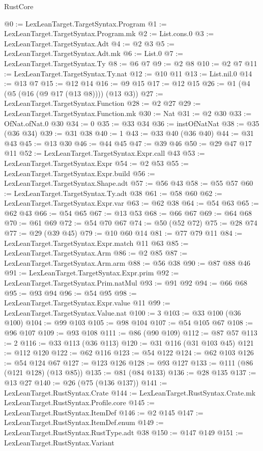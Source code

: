 \begin{lexlean}{RustCore}
\begin{coremodule}
@0 := LexLeanTarget.TargetSyntax.Program
@1 := LexLeanTarget.TargetSyntax.Program.mk
@2 := List.cons.{0}
@3 := LexLeanTarget.TargetSyntax.Adt
@4 := @2 @3
@5 := LexLeanTarget.TargetSyntax.Adt.mk
@6 := List.{0}
@7 := LexLeanTarget.TargetSyntax.Ty
@8 := @6 @7
@9 := @2 @8
@10 := @2 @7
@11 := LexLeanTarget.TargetSyntax.Ty.nat
@12 := @10 @11
@13 := List.nil.{0}
@14 := @13 @7
@15 := @12 @14
@16 := @9 @15
@17 := @12 @15
@26 := @1 (@4 (@5 (@16 (@9 @17 (@13 @8)))) (@13 @3))
@27 := LexLeanTarget.TargetSyntax.Function
@28 := @2 @27
@29 := LexLeanTarget.TargetSyntax.Function.mk
@30 := Nat
@31 := @2 @30
@33 := OfNat.ofNat.{0} @30
@34 := 0
@35 := @33 @34
@36 := instOfNatNat
@38 := @35 (@36 @34)
@39 := @31 @38
@40 := 1
@43 := @33 @40 (@36 @40)
@44 := @31 @43
@45 := @13 @30
@46 := @44 @45
@47 := @39 @46
@50 := @29 @47 @17 @11
@52 := LexLeanTarget.TargetSyntax.Expr.call @43
@53 := LexLeanTarget.TargetSyntax.Expr
@54 := @2 @53
@55 := LexLeanTarget.TargetSyntax.Expr.build
@56 := LexLeanTarget.TargetSyntax.Shape.adt
@57 := @56 @43
@58 := @55 @57
@60 := LexLeanTarget.TargetSyntax.Ty.adt @38
@61 := @58 @60
@62 := LexLeanTarget.TargetSyntax.Expr.var
@63 := @62 @38
@64 := @54 @63
@65 := @62 @43
@66 := @54 @65
@67 := @13 @53
@68 := @66 @67
@69 := @64 @68
@70 := @61 @69
@72 := @54 @70 @67
@74 := @50 (@52 @72)
@75 := @28 @74
@77 := @29 (@39 @45)
@79 := @10 @60 @14
@81 := @77 @79 @11
@84 := LexLeanTarget.TargetSyntax.Expr.match @11 @63
@85 := LexLeanTarget.TargetSyntax.Arm
@86 := @2 @85
@87 := LexLeanTarget.TargetSyntax.Arm.arm
@88 := @56 @38
@90 := @87 @88 @46
@91 := LexLeanTarget.TargetSyntax.Expr.prim
@92 := LexLeanTarget.TargetSyntax.Prim.natMul
@93 := @91 @92
@94 := @66 @68
@95 := @93 @94
@96 := @54 @95
@98 := LexLeanTarget.TargetSyntax.Expr.value @11
@99 := LexLeanTarget.TargetSyntax.Value.nat
@100 := 3
@103 := @33 @100 (@36 @100)
@104 := @99 @103
@105 := @98 @104
@107 := @54 @105 @67
@108 := @96 @107
@109 := @93 @108
@111 := @86 (@90 @109)
@112 := @87 @57
@113 := 2
@116 := @33 @113 (@36 @113)
@120 := @31 @116 (@31 @103 @45)
@121 := @112 @120
@122 := @62 @116
@123 := @54 @122
@124 := @62 @103
@126 := @54 @124 @67
@127 := @123 @126
@128 := @93 @127
@133 := @111 (@86 (@121 @128) (@13 @85))
@135 := @81 (@84 @133)
@136 := @28 @135
@137 := @13 @27
@140 := @26 (@75 (@136 @137))
@141 := LexLeanTarget.RustSyntax.Crate
@144 := LexLeanTarget.RustSyntax.Crate.mk LexLeanTarget.RustSyntax.Profile.core
@145 := LexLeanTarget.RustSyntax.ItemDef
@146 := @2 @145
@147 := LexLeanTarget.RustSyntax.ItemDef.enum
@149 := LexLeanTarget.RustSyntax.RustType.adt @38
@150 := @147 @149
@151 := LexLeanTarget.RustSyntax.Variant

\end{coremodule}
\end{lexlean}
